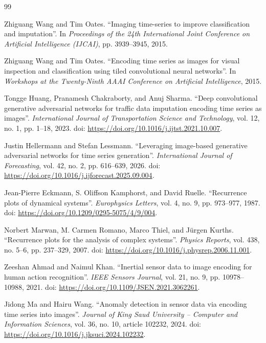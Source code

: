 \documentclass[preprint,12pt]{elsarticle}
\begin{document}
{\small
\begin{thebibliography}{99}
\setlength{\itemsep}{0pt}
\setlength{\parskip}{0pt}
\raggedright

Zhiguang Wang and Tim Oates. ``Imaging time-series to improve classification and imputation''. In \textit{Proceedings of the 24th International Joint Conference on Artificial Intelligence (IJCAI)}, pp. 3939--3945, 2015.

Zhiguang Wang and Tim Oates. ``Encoding time series as images for visual inspection and classification using tiled convolutional neural networks''. In \textit{Workshops at the Twenty-Ninth AAAI Conference on Artificial Intelligence}, 2015.

Tongge Huang, Pranamesh Chakraborty, and Anuj Sharma. ``Deep convolutional generative adversarial networks for traffic data imputation encoding time series as images''. \textit{International Journal of Transportation Science and Technology}, vol. 12, no. 1, pp. 1--18, 2023. doi: \url{https://doi.org/10.1016/j.ijtst.2021.10.007}.

Justin Hellermann and Stefan Lessmann. ``Leveraging image-based generative adversarial networks for time series generation''. \textit{International Journal of Forecasting}, vol. 42, no. 2, pp. 616--639, 2026. doi: \url{https://doi.org/10.1016/j.ijforecast.2025.09.004}.

Jean-Pierre Eckmann, S. Oliffson Kamphorst, and David Ruelle. ``Recurrence plots of dynamical systems''. \textit{Europhysics Letters}, vol. 4, no. 9, pp. 973--977, 1987. doi: \url{https://doi.org/10.1209/0295-5075/4/9/004}.

Norbert Marwan, M. Carmen Romano, Marco Thiel, and Jürgen Kurths. ``Recurrence plots for the analysis of complex systems''. \textit{Physics Reports}, vol. 438, no. 5--6, pp. 237--329, 2007. doi: \url{https://doi.org/10.1016/j.physrep.2006.11.001}.

Zeeshan Ahmad and Naimul Khan. ``Inertial sensor data to image encoding for human action recognition''. \textit{IEEE Sensors Journal}, vol. 21, no. 9, pp. 10978--10988, 2021. doi: \url{https://doi.org/10.1109/JSEN.2021.3062261}.

Jidong Ma and Hairu Wang. ``Anomaly detection in sensor data via encoding time series into images''. \textit{Journal of King Saud University -- Computer and Information Sciences}, vol. 36, no. 10, article 102232, 2024. doi: \url{https://doi.org/10.1016/j.jksuci.2024.102232}.


\end{thebibliography}}
\end{document}
